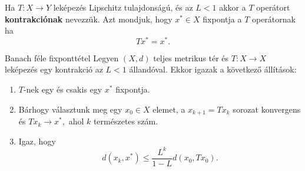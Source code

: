 \pagebreak
Ha $T:X\to Y$ lek\'epez\'es Lipschitz tulajdons\'ag\'u, \'es az $L<1$ akkor
a $T$ oper\'atort \textbf{kontrakci\'onak} nevezz\"uk. Azt mondjuk, hogy
$x^{*}\in X$ fixpontja a $T$ oper\'atornak ha 
\[
Tx^{*}=x^{*}.
\]
\begin{theorem}{Banach f\'ele fixpontt\'etel}
	Legyen $\left(X,d\right)$ teljes metrikus t\'er \'es $T:X\to X$ lek\'epez\'es
	egy kontrakci\'o az $L<1$ \'alland\'oval. Ekkor igazak a k\"ovetkez\H{o}
	\'all\'it\'asok:
	\begin{enumerate}
		\item $T$-nek egy \'es csakis egy $x^{*}$ fixpontja.
		\item B\'arhogy v\'alasztunk meg egy $x_{0}\in X$ elemet, a $x_{k+1}=Tx_{k}$
		sorozat konvergens \'es $Tx_{k}\to x^{*},$ ahol $k$ term\'eszetes sz\'am.
		\item Igaz, hogy 
		\[
		d\left(x_{k},x^{*}\right)\leq\frac{L^{k}}{1-L}d(x_{0},Tx_{0}).
		\]
	\end{enumerate}
\end{theorem}